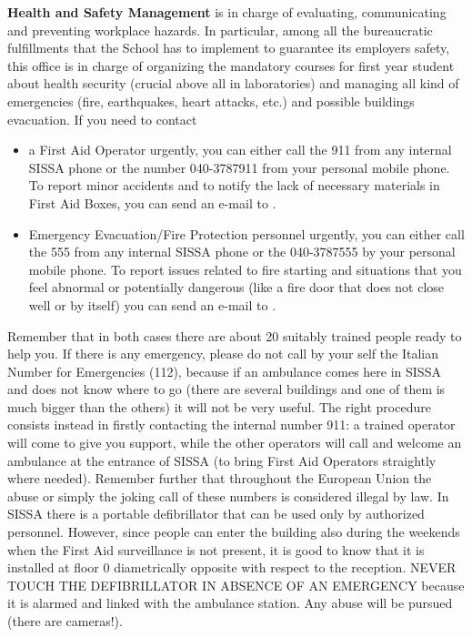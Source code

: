 \documentclass{sissavademecum}
\begin{document}
\textbf{Health and Safety Management} is in charge of evaluating, communicating and preventing workplace hazards. In particular, among all the bureaucratic fulfillments that the School has to implement to guarantee its employers safety, this office is in charge of organizing the mandatory courses for first year student about health security (crucial above all in laboratories) and managing all kind of emergencies (fire, earthquakes, heart attacks, etc.) and possible buildings evacuation. If you need to contact
\begin{itemize}
	\item  a First Aid Operator urgently, you can either call the \textcolor[rgb]{0.06666667,0.33333334,0.8}{911} from any internal SISSA phone or the number 040-3787911 from your personal mobile phone. To report minor accidents and to notify the lack of necessary materials in First Aid Boxes, you can send an e-mail to . 
	\item Emergency Evacuation/Fire Protection personnel urgently, you can either call the \textcolor[rgb]{0.06666667,0.33333334,0.8}{555} from any internal SISSA phone or the 040-3787555 by your personal mobile phone. To report issues related to fire starting and situations that you feel abnormal or potentially dangerous (like a fire door that does not close well or by itself) you can send an e-mail to . 
\end{itemize}
Remember that in both cases there are about 20 suitably trained people ready to help you. If there is any emergency, please do not call by your self the Italian Number for Emergencies (112), because if an ambulance comes here in SISSA and does not know where to go (there are several buildings and one of them is much bigger than the others) it will not be very useful. The right procedure consists instead in firstly contacting the internal number 911: a trained operator will come to give you support, while the other operators will call and welcome an ambulance at the entrance of SISSA (to bring First Aid Operators straightly where needed). Remember further that throughout the European Union the abuse or simply the joking call of these numbers is considered illegal by law. 
In SISSA there is a portable defibrillator that can be used only by authorized personnel. However, since people can enter the building also during the weekends when the First Aid surveillance is not present, it is good to know that it is installed at floor $0$ diametrically opposite with respect to the reception. NEVER TOUCH THE DEFIBRILLATOR IN ABSENCE OF AN EMERGENCY because it is alarmed and linked with the ambulance station. Any abuse will be pursued (there are cameras!). 
\end{document}
